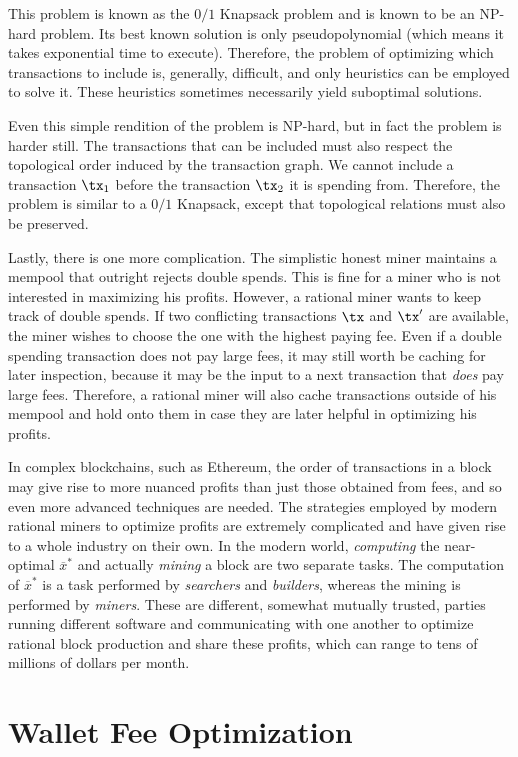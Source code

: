 This problem is known as the $0/1$ Knapsack problem and is known to be an NP-hard problem.
Its best known solution is only pseudopolynomial (which means it takes exponential time to
execute). Therefore, the problem of optimizing
which transactions to include is, generally, difficult, and only heuristics can be employed
to solve it. These heuristics sometimes necessarily yield suboptimal solutions.

Even this simple rendition of the problem is NP-hard, but in fact the problem is harder still.
The transactions that can be included must also respect the topological order induced by
the transaction graph. We cannot include a transaction $\tx_1$ before the transaction $\tx_2$
it is spending from. Therefore, the problem is similar to a $0/1$ Knapsack, except that
topological relations must also be preserved.

Lastly, there is one more complication. The simplistic honest miner maintains a mempool
that outright rejects double spends. This is fine for a miner who is not interested in
maximizing his profits. However, a rational miner wants to keep track of double spends.
If two conflicting transactions $\tx$ and $\tx'$ are available, the miner wishes to
choose the one with the highest paying fee. Even if a double spending transaction does
not pay large fees, it may still worth be caching for later inspection, because it may
be the input to a next transaction that \emph{does} pay large fees. Therefore, a rational
miner will also cache transactions outside of his mempool and hold onto them in case
they are later helpful in optimizing his profits.

In complex blockchains, such as Ethereum, the order of transactions in a block may give rise
to more nuanced profits than just those obtained from fees, and so even more advanced techniques
are needed. The strategies employed by modern rational miners to optimize profits are extremely
complicated and have given rise to a whole industry on their own. In the modern world,
\emph{computing} the near-optimal $\overline{x}^*$ and actually \emph{mining} a block
are two separate tasks. The computation of $\overline{x}^*$ is a task performed by
\emph{searchers} and \emph{builders}, whereas the mining is performed by \emph{miners}.
These are different, somewhat mutually trusted, parties running different software and
communicating with one another to optimize rational block production and share these
profits, which can range to tens of millions of dollars per month.

\section{Wallet Fee Optimization}


